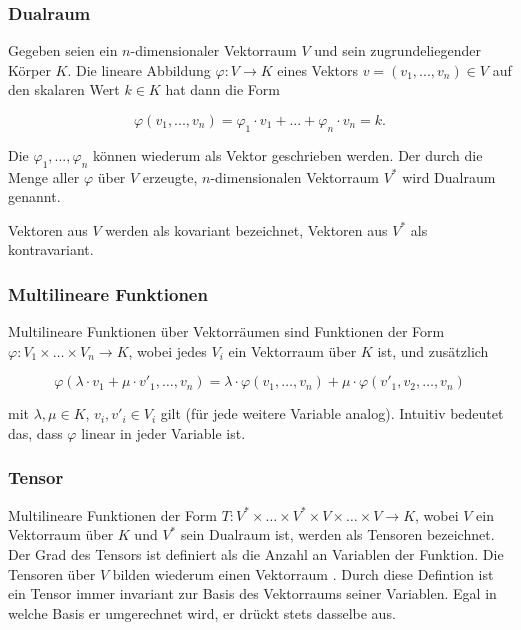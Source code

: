 \documentclass[a4paper,fontsize=12pt,toc=bib,halfparskip]{scrartcl}
\begin{document}
\subsubsection{Dualraum}
Gegeben seien ein $n$-dimensionaler Vektorraum  $V$ und sein zugrundeliegender K\"orper $K$. Die lineare Abbildung $\varphi: V \rightarrow K$ eines Vektors $v = (v_1, ..., v_n) \in V$ auf den skalaren Wert $k \in K$ hat dann die Form

\begin{equation}
	\varphi(v_1, ..., v_n) = \varphi_1 \cdot v_1 + ... + \varphi_n \cdot v_n = k.
\end{equation}

Die $\varphi_1, ..., \varphi_n$ k\"onnen wiederum als Vektor geschrieben werden. Der durch die Menge aller $\varphi$ \"uber $V$  erzeugte, $n$-dimensionalen Vektorraum $V^*$ wird Dualraum genannt\cite[S.~203]{bowen2008introduction}.

Vektoren aus $V$ werden als kovariant bezeichnet, Vektoren aus $V^*$ als kontravariant\cite[S.~205]{bowen2008introduction}.

\subsubsection{Multilineare Funktionen}
Multilineare Funktionen \"uber Vektorr\"aumen sind Funktionen der Form $\varphi: V_1 \times \dots \times V_n \rightarrow K$, wobei jedes $V_i$ ein Vektorraum \"uber $K$ ist, und zus\"atzlich 

\begin{equation}
	\varphi(\lambda \cdot v_1 + \mu \cdot v'_1, \dots, v_n) = \lambda \cdot \varphi(v_1, \dots, v_n) + \mu \cdot \varphi(v'_1, v_2, \dots, v_n)
\end{equation}

mit $\lambda, \mu \in K$, $v_i, v'_i \in V_i$ gilt (f\"ur jede weitere Variable analog). Intuitiv bedeutet das, dass $\varphi$ linear in jeder Variable ist\cite[S.~204, 218]{bowen2008introduction}.





\subsubsection{Tensor}
Multilineare Funktionen der Form $T: V^*\times\dots\times V^*\times V \times \dots \times V \rightarrow K$, wobei $V$ ein Vektorraum \"uber $K$ und $V^*$ sein Dualraum ist, werden als Tensoren bezeichnet\cite[S.~218]{bowen2008introduction}. Der Grad des Tensors ist definiert als die Anzahl an Variablen der Funktion. Die Tensoren \"uber $V$ bilden wiederum einen Vektorraum \cite[S.~220]{bowen2008introduction}. Durch diese Defintion ist ein Tensor immer invariant zur Basis des Vektorraums seiner Variablen. Egal in welche Basis er umgerechnet wird, er dr\"uckt stets dasselbe aus.
\end{document}
